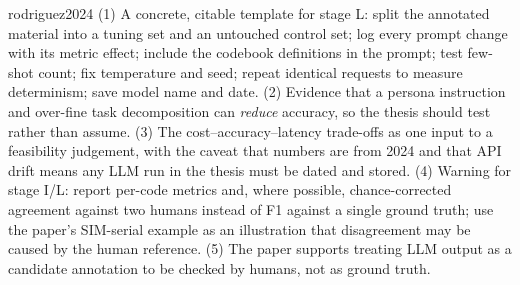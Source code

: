 \begin{papercard}{rodriguez2024}
 (1) A concrete, citable template for stage L: split the annotated material into a tuning set and an untouched control set; log every prompt change with its metric effect; include the codebook definitions in the prompt; test few-shot count; fix temperature and seed; repeat identical requests to measure determinism; save model name and date. (2) Evidence that a persona instruction and over-fine task decomposition can \emph{reduce} accuracy, so the thesis should test rather than assume. (3) The cost--accuracy--latency trade-offs as one input to a feasibility judgement, with the caveat that numbers are from 2024 and that API drift means any LLM run in the thesis must be dated and stored. (4) Warning for stage I/L: report per-code metrics and, where possible, chance-corrected agreement against two humans instead of F1 against a single ground truth; use the paper's SIM-serial example as an illustration that disagreement may be caused by the human reference. (5) The paper supports treating LLM output as a candidate annotation to be checked by humans, not as ground truth.
\end{papercard}
